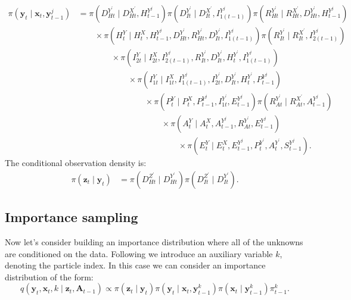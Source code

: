 \documentclass[a4paper]{article}
\newcommand{\bx}{\bm{x}}
\newcommand{\by}{\bm{y}}
\newcommand{\bz}{\bm{z}}
\newcommand{\bA}{\bm{A}}
\begin{document}
\begin{align}
    \pi\left(\by_t \mid \bx_t, \by^j_{t - 1}\right) &= \pi\left(D^{Y^\prime}_{Ht} \mid D^{X^\prime}_{Ht}, H^{Y^j}_{t - 1}\right)\pi\left(D^{Y^\prime}_{It} \mid D^{X^\prime}_{It}, I^{Y^j}_{1(t - 1)}\right)\pi\left(R^{Y^\prime}_{Ht} \mid R^{X^\prime}_{Ht}, D^{Y^\prime}_{Ht}, H^{Y^j}_{t - 1}\right)\nonumber\\
    & \qquad \times \pi\left(H^Y_t \mid H^X_t, H^{Y^j}_{t - 1}, D^{Y^\prime}_{Ht}, R^{Y^\prime}_{Ht}, D^{Y^\prime}_{It}, I^{Y^j}_{1(t - 1)}\right) \pi\left(R^{Y^\prime}_{It} \mid R^{X^\prime}_{It}, I^{Y^j}_{2(t - 1)}\right)\nonumber\\
    &\qquad \qquad \times \pi\left(I^Y_{2t} \mid I^X_{2t}, I^{Y^j}_{2(t - 1)}, R^{Y^\prime}_{It}, D^{Y^\prime}_{It}, H^{Y^\prime}_t, I^{Y^j}_{1(t - 1)}\right)\nonumber\\
    &\qquad \qquad \qquad \times\pi\left(I^Y_{1t} \mid I^X_{1t}, I^{Y^j}_{1(t - 1)}, I^{Y^\prime}_{2t}, D^{Y^\prime}_{It}, H^{Y^\prime}_t, P^{Y^j}_{t - 1}\right)\nonumber\\
    &\qquad \qquad \qquad \qquad \times \pi\left(P^Y_t \mid P^X_t, P^{Y^j}_{t - 1}, I^{Y^\prime}_{1t}, E^{Y^j}_{t - 1}\right)\pi\left(R^{Y^\prime}_{At} \mid R^{X^\prime}_{At}, A^{Y^j}_{t - 1}\right)\nonumber\\
    & \qquad \qquad \qquad \qquad \qquad \times \pi\left(A^Y_t \mid A^X_t, A^{Y^j}_{t - 1}, R^{Y^\prime}_{At}, E^{Y^j}_{t - 1}\right)\nonumber\\
    & \qquad \qquad \qquad \qquad \qquad \qquad \times \pi\left(E^Y_t \mid E^X_t, E^{Y^j}_{t - 1}, P^{Y^\prime}_t, A^{Y^\prime}_t, S^{Y^j}_{t - 1}\right).\label{eq:mdlike}
\end{align}
The conditional observation density is:
\begin{align}
    \pi\left(\bz_t \mid \by_t\right) &= \pi\left(D^{Z^\prime}_{Ht} \mid D^{Y^\prime}_{Ht}\right)\pi\left(D^{Z^\prime}_{It} \mid D^{Y^\prime}_{It}\right).\label{eq:obsdens}
\end{align}

\subsection{Importance sampling}

Now let's consider building an importance distribution where all of the unknowns are conditioned on the data. Following \cite{pitt_shephard:1999} we introduce an auxiliary variable $k$, denoting the particle index. In this case we can consider an importance distribution of the form:
\begin{equation}\label{eq:apf3}
    q\left(\by_t, \bx_t, k \mid \bz_t, \bA_{t - 1}\right) \propto \pi\left(\bz_t \mid \by_t\right)\pi\left(\by_t \mid \bx_t, \by^k_{t - 1}\right)\pi\left(\bx_t \mid \by^k_{t - 1}\right)\pi^k_{t - 1}.
\end{equation}
\end{document}
